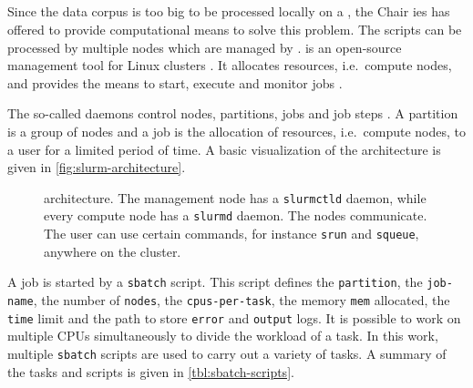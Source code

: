 
\subsection{\slurm{}}\label{subsec:slurm}

Since the data corpus is too big to be processed locally on a \localMaschineStats{}, the Chair \ac{ies} has offered to provide computational means to solve this problem.
The scripts can be processed by multiple nodes which are managed by \slurm{}. 
\slurm{} is an open-source management tool for Linux clusters \cite{slurm-online}.
It allocates resources, i.e.\ compute nodes, and provides the means to start, execute and monitor jobs \cite{slurm-online, slurm2003}.

The so-called \slurm{} daemons control nodes, partitions, jobs and job steps \cite{slurm-online}.
A partition is a group of nodes and a job is the allocation of resources, i.e.\ compute nodes, to a user for a limited period of time.
A basic visualization of the architecture is given in \autoref{fig:slurm-architecture}.

\begin{figure}[!htb] %
    \centering
    
    \caption[\slurm{} architecture]{\slurm{} architecture. The management node has a \texttt{slurmctld} daemon, while every compute node has a \texttt{slurmd} daemon.
    The nodes communicate.
    The user can use certain commands, for instance \texttt{srun} and \texttt{squeue}, anywhere on the cluster.
    }
    \label{fig:slurm-architecture}
\end{figure}

A job is started by a \texttt{sbatch} script.
This script defines the \texttt{partition}, the \texttt{job-name}, the number of \texttt{nodes}, the \texttt{cpus-per-task}, the memory \texttt{mem} allocated, 
the \texttt{time} limit and the path to store \texttt{error} and \texttt{output} logs.
It is possible to work on multiple CPUs simultaneously to divide the workload of a task.
In this work, multiple \texttt{sbatch} scripts are used to carry out a variety of tasks.
A summary of the tasks and scripts is given in \autoref{tbl:sbatch-scripts}.

